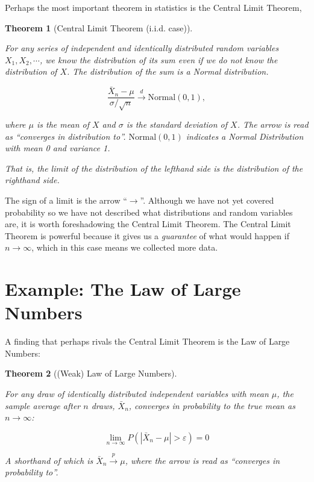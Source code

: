 \documentclass[
  letterpaper,
]{book}
\theoremstyle{definition}
\theoremstyle{definition}
\theoremstyle{plain}
\theoremstyle{definition}
\theoremstyle{plain}
\newtheorem{theorem}{Theorem}[chapter]
\theoremstyle{plain}
\theoremstyle{remark}
\begin{document}
Perhaps the most important theorem in statistics is the Central Limit
Theorem,

\leavevmode{}%
\begin{theorem}[Central Limit Theorem (i.i.d. case)]\label{thm-clt-lim}

For any series of independent and identically distributed random
variables \(X_1, X_2, \cdots\), we know the distribution of its sum even
if we do not know the distribution of \(X\). The distribution of the sum
is a Normal distribution.

\[\frac{\bar{X}_n - \mu}{\sigma / \sqrt{n}} \xrightarrow{d} \text{Normal}(0, 1),\]

where \(\mu\) is the mean of \(X\) and \(\sigma\) is the standard
deviation of \(X\). The arrow is read as ``converges in distribution
to''. \(\text{Normal}(0, 1)\) indicates a Normal Distribution with mean
0 and variance 1.

That is, the limit of the distribution of the lefthand side is the
distribution of the righthand side.

\end{theorem}

The sign of a limit is the arrow ``\(\rightarrow\)''. Although we have
not yet covered probability so we have not described what distributions
and random variables are, it is worth foreshadowing the Central Limit
Theorem. The Central Limit Theorem is powerful because it gives us a
\emph{guarantee} of what would happen if \(n \rightarrow \infty\), which
in this case means we collected more data.

\hypertarget{example-the-law-of-large-numbers}{%
\section*{Example: The Law of Large
Numbers}\label{example-the-law-of-large-numbers}}

A finding that perhaps rivals the Central Limit Theorem is the Law of
Large Numbers:

\leavevmode{}%
\begin{theorem}[(Weak) Law of Large Numbers]\label{thm-lln-lim}

For any draw of identically distributed independent variables with mean
\(\mu\), the sample average after \(n\) draws, \(\bar{X}_n\), converges
in probability to the true mean as \(n \rightarrow \infty\):

\[\lim\limits_{n\to \infty} P(|\bar{X}_n - \mu | > \varepsilon) = 0\]

A shorthand of which is \(\bar{X}_n \xrightarrow{p} \mu\), where the
arrow is read as ``converges in probability to''.

\end{theorem}
\end{document}
